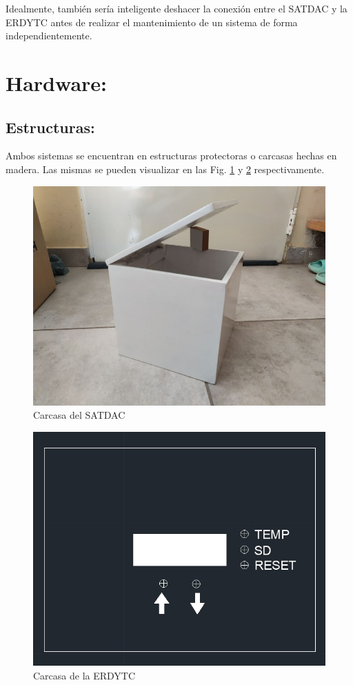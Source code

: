 \documentclass[conference]{IEEEtran}
\begin{document}
Idealmente, también sería inteligente deshacer la conexión entre el SATDAC y la ERDYTC antes de realizar el mantenimiento de un sistema de forma independientemente.
\section{Hardware:}
\label{sec:org1633663}
\subsection{Estructuras:}
\label{sec:org6642e7f}
Ambos sistemas se encuentran en estructuras protectoras o carcasas hechas en madera. Las mismas se pueden visualizar en las Fig. \ref{fig:cuboFisico} y \ref{fig:estacionFisico} respectivamente.

\begin{figure}[htbp]
\centering
\includegraphics[width=.9\linewidth]{../../images/cuboFisico.png}
\caption{\label{fig:cuboFisico}Carcasa del SATDAC}
\end{figure}

\begin{figure}[htbp]
\centering
\includegraphics[width=.9\linewidth]{../../images/estacionFisico.png}
\caption{\label{fig:estacionFisico}Carcasa de la ERDYTC}
\end{figure}
\end{document}
